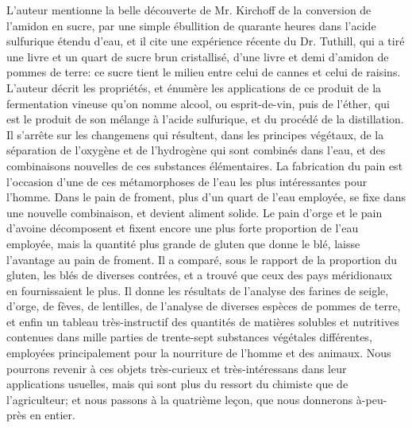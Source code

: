 L'auteur mentionne la belle découverte de Mr. Kirchoff de la conversion de l'amidon en sucre, par une simple ébullition de quarante heures dans l'acide sulfurique étendu d'eau, et il cite une expérience récente du Dr. Tuthill, qui a tiré une livre et un quart de sucre brun cristallisé, d'une\setcounter{page}{413} livre et demi d'amidon de pommes de terre: ce sucre tient le milieu entre celui de cannes et celui de raisins. L'auteur décrit les propriétés, et énumère les applications de ce produit de la fermentation vineuse qu'on nomme alcool, ou esprit-de-vin, puis de l'éther, qui est le produit de son mélange à l'acide sulfurique, et du procédé de la distillation. Il s'arrête sur les changemens qui résultent, dans les principes végétaux, de la séparation de l'oxygène et de l'hydrogène qui sont combinés dans l'eau, et des combinaisons nouvelles de ces substances élémentaires. La fabrication du pain est l'occasion d'une de ces métamorphoses de l'eau les plus intéressantes pour l'homme. Dans le pain de froment, plus d'un quart de l'eau employée, se fixe dans une nouvelle combinaison, et devient aliment solide. Le pain d'orge et le pain d'avoine décomposent et fixent encore une plus forte proportion de l'eau employée, mais la quantité plus grande de gluten que donne le blé, laisse l'avantage au pain de froment. Il a comparé, sous le rapport de la proportion du gluten, les blés de diverses contrées, et a trouvé que ceux des pays méridionaux en fournissaient le plus. Il donne les résultats de l'analyse des farines de seigle,\setcounter{page}{414} d'orge, de fèves, de lentilles, de l'analyse de diverses espèces de pommes de terre, et enfin un tableau très-instructif des quantités de matières solubles et nutritives contenues dans mille parties de trente-sept substances végétales différentes, employées principalement pour la nourriture de l'homme et des animaux. Nous pourrons revenir à ces objets très-curieux et très-intéressans dans leur applications usuelles, mais qui sont plus du ressort du chimiste que de l'agriculteur; et nous passons à la quatrième leçon, que nous donnerons à-peu-près en entier.
